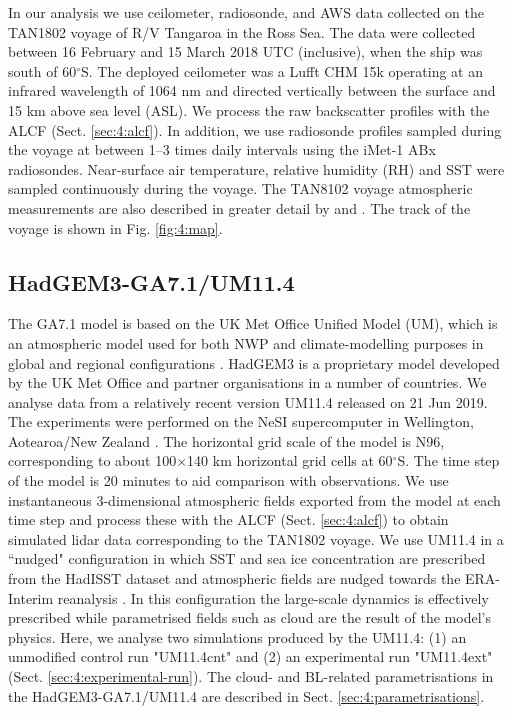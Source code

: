 In our analysis we use ceilometer, radiosonde, and AWS data collected on the TAN1802 voyage
of R/V Tangaroa in the Ross Sea. The data were collected
between 16 February and 15 March 2018 UTC (inclusive), when the ship was south of
60$^\circ$S. The deployed ceilometer was a Lufft CHM 15k operating at an
infrared wavelength of 1064 nm and directed vertically between the surface and 15 km above
sea level (ASL). We process the raw backscatter profiles with
the ALCF (Sect. \ref{sec:4:alcf}). In addition, we use radiosonde profiles
sampled during the voyage at between 1--3 times daily intervals
using the iMet-1 ABx radiosondes. Near-surface air temperature, relative humidity (RH) and SST were sampled continuously during the voyage. The TAN8102
voyage atmospheric measurements are also described in greater detail by
\cite{kuma2020a} and \cite{hartery2020a}. The track of the voyage
is shown in Fig. \ref{fig:4:map}.

\subsection{HadGEM3-GA7.1/UM11.4}

The GA7.1 model is based on the UK Met Office Unified Model (UM), which is an
atmospheric model used for both NWP and climate-modelling purposes in global and regional
configurations \citep{walters2019}. HadGEM3 is a proprietary model developed by the UK Met Office
and partner organisations in a number of countries. We analyse data from a relatively
recent version UM11.4 released on 21 Jun 2019. The experiments were performed on the NeSI
supercomputer in Wellington, Aotearoa/New Zealand \citep{williams2016}.
The horizontal grid scale of the model is N96,
corresponding to about 100$\times$140 km horizontal grid cells at
60$^\circ$S. The time step of the model is 20 minutes to aid comparison with observations.  %
We use instantaneous 3-dimensional atmospheric fields exported from the model at each time
step and process these with the ALCF (Sect. \ref{sec:4:alcf}) to obtain simulated
lidar data corresponding to the TAN1802 voyage. We use UM11.4 in a ``nudged"
configuration in which SST and sea ice concentration are prescribed from
the HadISST dataset \citep{rayner2003} and atmospheric fields are nudged towards the
ERA-Interim reanalysis \citep{dee2011}. In this configuration the large-scale
dynamics is effectively prescribed while parametrised fields
such as cloud are the result of the model's physics. Here, we analyse
two simulations produced by the UM11.4: (1) an unmodified control run "UM11.4cnt"
and (2) an experimental run "UM11.4ext" (Sect. \ref{sec:4:experimental-run}).
The cloud- and BL-related parametrisations in the HadGEM3-GA7.1/UM11.4 are described in Sect. \ref{sec:4:parametrisations}.

